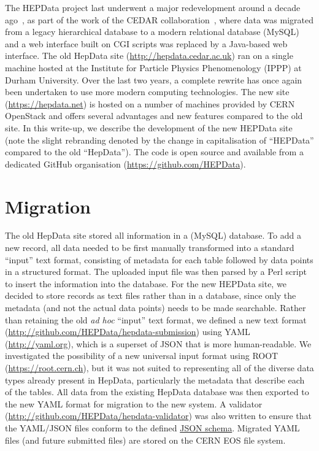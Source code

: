 \documentclass[a4paper]{jpconf}
\begin{document}
The HEPData project last underwent a major redevelopment around a decade
ago~\cite{Buckley:2010jn}, as part of the work of the CEDAR
collaboration~\cite{Buckley:2007hi}, where data was migrated from a legacy
hierarchical database to a modern relational database (MySQL) and a web
interface built on CGI scripts was replaced by a Java-based web interface.  The
old HepData site (\url{http://hepdata.cedar.ac.uk}) ran on a single machine
hosted at the Institute for Particle Physics Phenomenology (IPPP) at Durham
University.  Over the last two years, a complete rewrite has once again been
undertaken to use more modern computing technologies.  The new site
(\url{https://hepdata.net}) is hosted on a number of machines provided by CERN
OpenStack and offers several advantages and new features compared to the old
site.  In this write-up, we describe the development of the new HEPData site
(note the slight rebranding denoted by the change in capitalisation of
``HEPData'' compared to the old ``HepData'').  The code is open source and
available from a dedicated GitHub organisation
(\url{https://github.com/HEPData}).

\section{Migration}

The old HepData site stored all information in a (MySQL) database.  To add a
new record, all data needed to be first manually transformed into a standard
``input'' text format, consisting of metadata for each table followed by data
points in a structured format.  The uploaded input file was then parsed by a
Perl script to insert the information into the database.  For the new HEPData
site, we decided to store records as text files rather than in a database,
since only the metadata (and not the actual data points) needs to be made
searchable.  Rather than retaining the old \emph{ad hoc} ``input'' text format,
we defined a new text format
(\url{http://github.com/HEPData/hepdata-submission}) using YAML
(\url{http://yaml.org}), which is a superset of JSON that is more
human-readable.  We
investigated the possibility of a new universal input format using ROOT
(\url{https://root.cern.ch}), but it was not suited to representing all of the
diverse data types already present in HepData, particularly the metadata that
describe each of the tables.  All data from the existing HepData database was
then exported to the new YAML format for migration to the new system.  A
validator (\url{http://github.com/HEPData/hepdata-validator}) was also written
to ensure that the YAML/JSON files conform to the defined
\href{https://github.com/HEPData/hepdata-validator/tree/master/hepdata_validator/schemas}{JSON schema}.
 Migrated YAML
files (and future submitted files) are stored on the CERN EOS file system.
\end{document}
